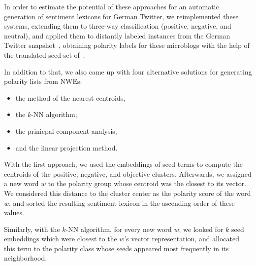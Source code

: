 In order to estimate the potential of these approaches for an
automatic generation of sentiment lexicons for German Twitter, we
reimplemented these systems, extending them to three-way
classification (positive, negative, and neutral), and applied them to
distantly labeled instances from the German Twitter
snapshot~\cite{Scheffler:14}, obtaining polarity labels for these
microblogs with the help of the translated seed set
of~\citet{Turney:03}.

In addition to that, we also came up with four alternative solutions
for generating polarity lists from NWEs:
\begin{itemize}
\item the method of the nearest centroids,
\item the $k$-NN algorithm;
\item the prinicpal component analysis,
\item and the linear projection method.
\end{itemize}

With the first approach, we used the embeddings of seed terms to
compute the centroids of the positive, negative, and objective
clusters.  Afterwards, we assigned a new word $w$ to the polarity
group whose centroid was the closest to its vector.  We considered
this distance to the cluster center as the polarity score of the word
$w$, and sorted the resulting sentiment lexicon in the ascending order
of these values.

Similarly, with the $k$-NN algorithm, for every new word $w$, we
looked for $k$ seed embeddings which were closest to the $w$'s vector
representation, and allocated this term to the polarity class whose
seeds appeared most frequently in its neighborhood.


